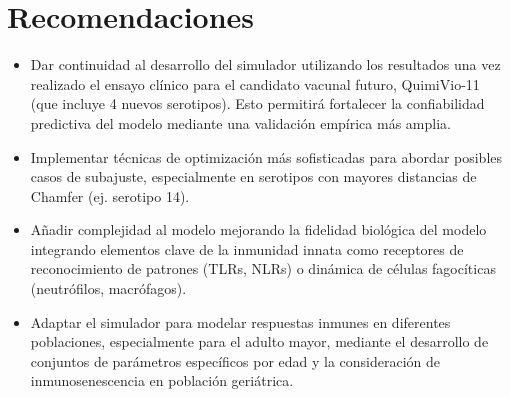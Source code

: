 \chapter*{Recomendaciones}\label{chapter:recomendations}

\begin{itemize}
    \item Dar continuidad al desarrollo del simulador utilizando los resultados una vez realizado el ensayo clínico para el candidato vacunal futuro, QuimiVio-11 (que incluye 4 nuevos serotipos). Esto permitirá fortalecer la confiabilidad predictiva del modelo mediante una validación empírica más amplia.

    \item Implementar técnicas de optimización más sofisticadas para abordar posibles casos de subajuste, especialmente en serotipos con mayores distancias de Chamfer (ej. serotipo 14). 


    \item Añadir complejidad al modelo mejorando la fidelidad biológica del modelo integrando elementos clave de la inmunidad innata como receptores de reconocimiento de patrones (TLRs, NLRs) o dinámica de células fagocíticas (neutrófilos, macrófagos).
    

    \item Adaptar el simulador para modelar respuestas inmunes en diferentes poblaciones, especialmente para el adulto mayor, mediante el desarrollo de conjuntos de parámetros específicos por edad y la consideración de inmunosenescencia en población geriátrica.
    

\end{itemize}